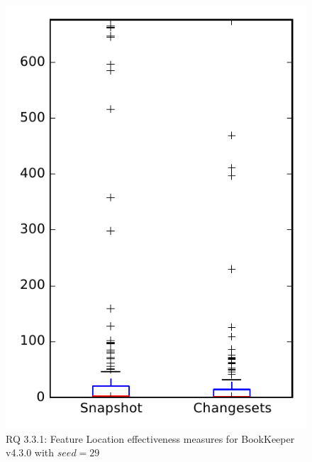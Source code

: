 
\begin{figure}
\centering
\includegraphics[height=0.4\textheight]{figures/flt_seed/rq1_bookkeeper_29}
\caption{RQ 3.3.1: Feature Location effectiveness measures for BookKeeper v4.3.0 with $seed=29$}
\label{fig:flt_seed:rq1:bookkeeper}
\end{figure}
